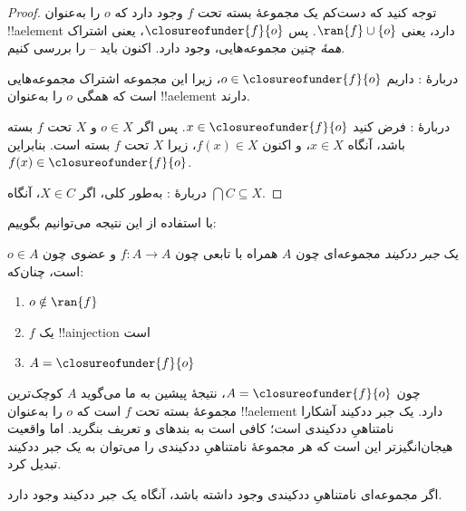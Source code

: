 \documentclass[../../../include/open-logic-section]{subfiles}
\begin{document}
\begin{proof}
توجه کنید که دست‌کم یک مجموعهٔ بسته تحت $f$ وجود دارد که $o$ را به‌عنوان
!!a{element} دارد، یعنی $\ran{f}\cup \{o\}$. پس
$\closureofunder{f}{o}$، یعنی اشتراک \emph{همهٔ} چنین مجموعه‌هایی، وجود
دارد. اکنون باید -- را
بررسی کنیم.

دربارهٔ : داریم $o \in \closureofunder{f}{o}$،
زیرا این مجموعه اشتراک مجموعه‌هایی است که همگی $o$ را به‌عنوان
!!a{element} دارند.

دربارهٔ : فرض کنید $x \in
\closureofunder{f}{o}$. پس اگر $o \in X$ و $X$ تحت $f$ بسته باشد، آنگاه
$x \in X$، و اکنون $f(x) \in X$، زیرا $X$ تحت $f$ بسته است. بنابراین
$f(x) \in \closureofunder{f}{o}$.

دربارهٔ : به‌طور کلی، اگر $X \in C$، آنگاه
$\bigcap C \subseteq X$.
\end{proof}

با استفاده از این نتیجه می‌توانیم بگوییم:

\begin{defn}
یک \emph{جبر ددکیند} مجموعه‌ای چون $A$ همراه با تابعی چون $f
\colon A \to A$ و عضوی چون $o \in A$ است، چنان‌که:
	\begin{enumerate}
		\item {} $o \notin \ran{f}$
		\item {} $f$ یک !!a{injection} است
		\item {} $A = \closureofunder{f}{o}$
	\end{enumerate}
\end{defn}

چون $A = \closureofunder{f}{o}$، نتیجهٔ پیشین به ما می‌گوید $A$
کوچک‌ترین مجموعهٔ بسته تحت $f$ است که $o$ را به‌عنوان !!a{element}
دارد. یک جبر ددکیند آشکارا نامتناهیِ ددکیندی است؛ کافی است به بندهای
 و  تعریف بنگرید. اما واقعیت
هیجان‌انگیزتر این است که هر مجموعهٔ نامتناهیِ ددکیندی را می‌توان به یک
جبر ددکیند تبدیل کرد.

\begin{thm}
اگر مجموعه‌ای نامتناهیِ ددکیندی وجود داشته باشد، آنگاه یک جبر ددکیند وجود
دارد.
\end{thm}
\end{document}
